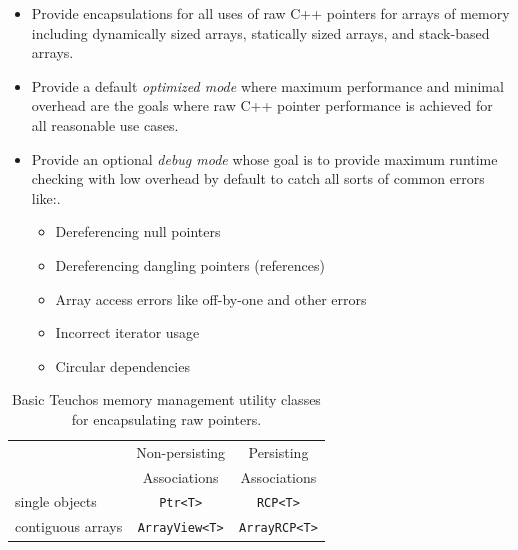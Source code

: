 \documentclass[pdf,ps2pdf,11pt]{SANDreport}
\begin{document}
\begin{itemize}
{}\item Provide encapsulations for all uses of raw C++ pointers for
arrays of memory including dynamically sized arrays, statically sized
arrays, and stack-based arrays.

{}\item Provide a default {}\textit{optimized mode} where maximum
performance and minimal overhead are the goals where raw C++ pointer
performance is achieved for all reasonable use cases.

{}\item Provide an optional {}\textit{debug mode} whose goal is to
provide maximum runtime checking with low overhead by default to catch
all sorts of common errors like:.

  \begin{itemize}
  {}\item Dereferencing null pointers
  {}\item Dereferencing dangling pointers (references)
  {}\item Array access errors like off-by-one and other errors
  {}\item Incorrect iterator usage
  {}\item Circular dependencies
  \end{itemize}

\end{itemize}


\begin{table}
\begin{center}
\begin{tabular}{|l|c|c|}
\hline
& Non-persisting
& Persisting \\
& Associations
& Associations \\
\hline
single objects
& {}\texttt{Ptr<T>}
& {}\texttt{RCP<T>} \\
\hline
contiguous arrays
& {}\texttt{ArrayView<T>}
& {}\texttt{ArrayRCP<T>} \\
\hline
\end{tabular}
\end{center}
\caption{\label{tbl:BasicSingleArrayTypes}
Basic Teuchos memory management utility classes for encapsulating raw
pointers.}
\end{table}
\end{document}
